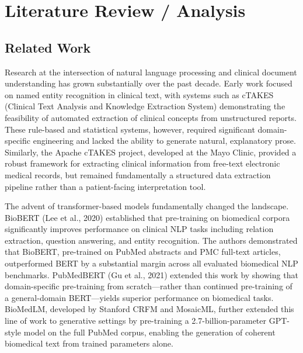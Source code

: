 \chapter{Literature Review / Analysis}

\section{Related Work}
Research at the intersection of natural language processing and clinical document understanding has grown substantially over the past decade. Early work focused on named entity recognition in clinical text, with systems such as cTAKES (Clinical Text Analysis and Knowledge Extraction System) demonstrating the feasibility of automated extraction of clinical concepts from unstructured reports. These rule-based and statistical systems, however, required significant domain-specific engineering and lacked the ability to generate natural, explanatory prose. Similarly, the Apache cTAKES project, developed at the Mayo Clinic, provided a robust framework for extracting clinical information from free-text electronic medical records, but remained fundamentally a structured data extraction pipeline rather than a patient-facing interpretation tool.

The advent of transformer-based models fundamentally changed the landscape. BioBERT (Lee et al., 2020) established that pre-training on biomedical corpora significantly improves performance on clinical NLP tasks including relation extraction, question answering, and entity recognition. The authors demonstrated that BioBERT, pre-trained on PubMed abstracts and PMC full-text articles, outperformed BERT by a substantial margin across all evaluated biomedical NLP benchmarks. PubMedBERT (Gu et al., 2021) extended this work by showing that domain-specific pre-training from scratch---rather than continued pre-training of a general-domain BERT---yields superior performance on biomedical tasks. BioMedLM, developed by Stanford CRFM and MosaicML, further extended this line of work to generative settings by pre-training a 2.7-billion-parameter GPT-style model on the full PubMed corpus, enabling the generation of coherent biomedical text from trained parameters alone.

